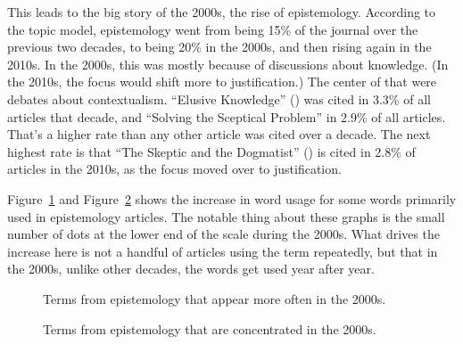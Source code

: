 \documentclass[
  10pt,
  letterpaper,
  DIV=11,
  numbers=noendperiod,
  twoside]{scrartcl}
\begin{document}
This leads to the big story of the 2000s, the rise of epistemology.
According to the topic model, epistemology went from being 15\% of the
journal over the previous two decades, to being 20\% in the 2000s, and
then rising again in the 2010s. In the 2000s, this was mostly because of
discussions about knowledge. (In the 2010s, the focus would shift more
to justification.) The center of that were debates about contextualism.
``Elusive Knowledge'' ()
was cited in 3.3\% of all articles that decade, and ``Solving the
Sceptical Problem'' in 2.9\% of all articles. That's a higher rate than
any other article was cited over a decade. The next highest rate is that
``The Skeptic and the Dogmatist''
() is cited in 2.8\% of
articles in the 2010s, as the focus moved over to justification.

Figure~\ref{fig-2000s-epistemology-big} and
Figure~\ref{fig-2000s-epistemology-small} shows the increase in word
usage for some words primarily used in epistemology articles. The
notable thing about these graphs is the small number of dots at the
lower end of the scale during the 2000s. What drives the increase here
is not a handful of articles using the term repeatedly, but that in the
2000s, unlike other decades, the words get used year after year.

\begin{figure}


\caption{\label{fig-2000s-epistemology-big}Terms from epistemology that
appear more often in the 2000s.}

\end{figure}%

\begin{figure}


\caption{\label{fig-2000s-epistemology-small}Terms from epistemology
that are concentrated in the 2000s.}

\end{figure}%
\end{document}
